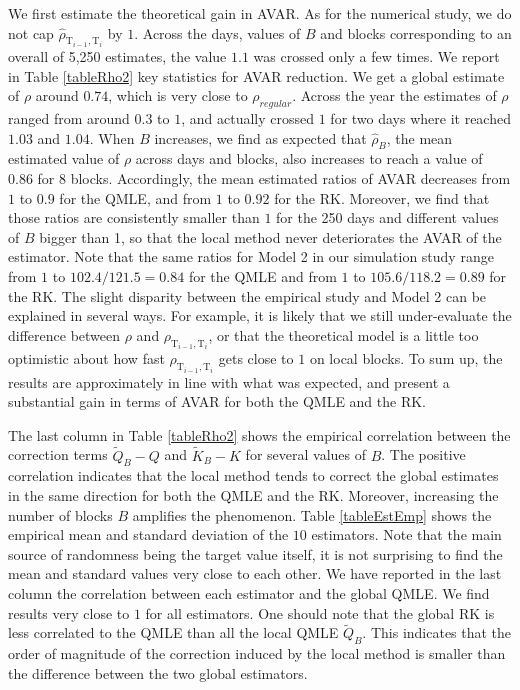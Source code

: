 \documentclass[11pt]{article}
\numberwithin{equation}{section}
\newcommand{\Tau}{\mathrm{T}}
\theoremstyle{plain}
\theoremstyle{remark}
\begin{document}
\smallskip
We first estimate the theoretical gain in AVAR. As for the numerical study, we do not cap $\widehat{\rho}_{\Tau_{i-1}, \Tau_i}$ by $1$. Across the days, values of $B$ and blocks corresponding to an overall of 5,250 estimates, the value $1.1$ was crossed only a few times. We report in Table \ref{tableRho2} key statistics for AVAR reduction. We get a global estimate of $\rho$ around $0.74$, which is very close to $\rho_{regular}$. Across the year the estimates of $\rho$ ranged from around $0.3$ to $1$, and actually crossed $1$ for two days where it reached $1.03$ and $1.04$. When $B$ increases, we find as expected that $\widehat{\rho}_B$, the mean estimated value of $\rho$ across days and blocks, also increases to reach a value of $0.86$ for $8$ blocks. Accordingly, the mean estimated ratios of AVAR decreases from $1$ to $0.9$ for the QMLE, and from $1$ to $0.92$ for the RK. Moreover, we find that those ratios are consistently smaller than $1$ for the 250 days and different values of $B$ bigger than 1, so that the local method never deteriorates the AVAR of the estimator. Note that the same ratios for Model 2 in our simulation study range from $1$ to $102.4/121.5 = 0.84$ for the QMLE and from $1$ to $105.6/118.2=0.89$ for the RK. The slight disparity between the empirical study and Model 2 can be explained in several ways. For example, it is likely that we still under-evaluate the difference between $\rho$ and $\rho_{\Tau_{i-1}, \Tau_i}$, or that the theoretical model is a little too optimistic about how fast $\rho_{\Tau_{i-1}, \Tau_i}$ gets close to $1$ on local blocks. To sum up, the results are approximately in line with what was expected, and present a substantial gain in terms of AVAR for both the QMLE and the RK.    

\smallskip
The last column in Table \ref{tableRho2} shows the empirical correlation between the correction terms $\tilde{Q}_B - Q$ and $\tilde{K}_B - K$ for several values of $B$. The positive correlation indicates that the local method tends to correct the global estimates in the same direction for both the QMLE and the RK. Moreover, increasing the number of blocks $B$ amplifies the phenomenon. Table \ref{tableEstEmp} shows the empirical mean and standard deviation of the $10$ estimators. Note that the main source of randomness being the target value itself, it is not surprising to find the mean and standard values very close to each other. We have reported in the last column the correlation between each estimator and the global QMLE. We find results very close to $1$ for all estimators. One should note that the global RK is less correlated to the QMLE than all the local QMLE $\tilde{Q}_B$. This indicates that the order of magnitude of the correction induced by the local method is smaller than the difference between the two global estimators. 
\end{document}
